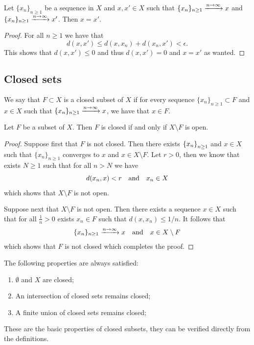 \documentclass[11pt,a4paper]{article}
\begin{document}
\begin{proposition}
  Let $\{x_n\}_{n \geq 1}$ be a sequence in $X$ and $x, x' \in X$ such
  that $\{x_n\}_{n \geq 1} \xrightarrow{n \to \infty} x$ and
  $\{x_n\}_{n \geq 1} \xrightarrow{n \to \infty} x'$. Then $x = x'$.
\end{proposition}
\begin{proof}
  For all $n \geq 1$ we have that
  \[
    d(x,x') \le d(x,x_n) + d(x_n,x') < \epsilon.
  \]
  This shows that $d(x,x') \le 0$ and thus $d(x,x') = 0$ and $x = x'$
  as wanted.
\end{proof}

\subsection{Closed sets}

\begin{definition}
  We say that $F \subset X$ is a closed subset of $X$ if for every
  sequence $\{x_n\}_{n \geq 1} \subset F$ and $x \in X$ such that
  $\{x_n\}_{n \geq 1} \xrightarrow{n \to \infty} x$, we have that
  $x \in F$.
\end{definition}
\begin{proposition}
  Let $F$ be a subset of $X$. Then $F$ is closed if and only if 
  $X \setminus F$ is open.
\end{proposition}
\begin{proof}
  Suppose first that $F$ is not closed.
  Then there exists $\left\{x_n\right\}_{n \geq 1}$
  and $x \in X$ such that $\{x_n\}_{n \geq 1}$ converges to $x$
  and $x \in X \setminus F$. Let $r > 0$, then we know that exists
  $N \geq 1$ such that for all $n > N$ we have
  \[
    d(x_n,x) < r \quad \text{and} \quad x_n \in X
  \]
  which shows that $X \setminus F$ is not open.

  Suppose next that $X \setminus F$ is not open.
  Then there exists a sequence
  $x \in X$ such that for all $\frac{1}{n} > 0$ exists
  $x_n \in F$ such that $d(x,x_n) \le 1/n$. It follows that
  \[
    \{x_n\}_{n \geq 1} \xrightarrow{n \to \infty} x \quad \text{and} \quad
    x \in X \setminus F
  \]
  which shows that $F$ is not closed which completes the proof.
\end{proof}

\begin{proposition}
  The following properties are always satisfied:
  \begin{enumerate}
    \item[(1)] $\emptyset$ and $X$ are closed;
    \item[(2)] An intersection of closed sets remains closed;
    \item[(3)] A finite union of closed sets remains closed;
  \end{enumerate}
\end{proposition}
These are the basic properties of closed subsets, they can be verified
directly from the definitions.
\end{document}
